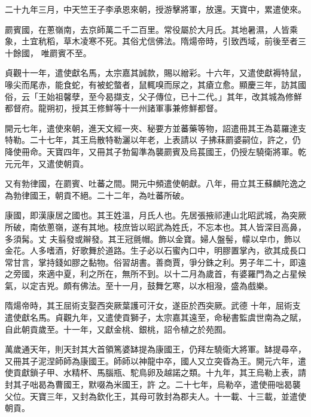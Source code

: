 \begin{pinyinscope}
 二十九年三月，中天竺王子李承恩來朝，授游擊將軍，放還。天寶中，累遣使來。



 罽賓國，在蔥嶺南，去京師萬二千二百里。常役屬於大月氏。其地暑濕，人皆乘象，土宜秔稻，草木凌寒不死。其俗尤信佛法。隋煬帝時，引致西域，前後至者三十餘國，
 唯罽賓不至。



 貞觀十一年，遣使獻名馬，太宗嘉其誠款，賜以繒彩。十六年，又遣使獻褥特鼠，喙尖而尾赤，能食蛇，有被蛇螫者，鼠輒嗅而尿之，其瘡立愈。顯慶三年，訪其國俗，云「王始祖馨孽，至今曷擷支，父子傳位，已十二代。」其年，改其城為修鮮都督府。龍朔初，授其王修鮮等十一州諸軍事兼修鮮都督。



 開元七年，遣使來朝，進天文經一夾、秘要方並蕃藥等物，詔遣冊其王為葛羅達支特勒。二十七年，其王烏散特勒灑以年老，上表請以
 子拂菻罽婆嗣位，許之，仍降使冊命。天寶四年，又冊其子勃匐準為襲罽賓及烏萇國王，仍授左驍衛將軍。乾元元年，又遣使朝貢。



 又有勃律國，在罽賓、吐蕃之間。開元中頻遣使朝獻。八年，冊立其王蘇麟陀逸之為勃律國王，朝貢不絕。二十二年，為吐蕃所破。



 康國，即漢康居之國也。其王姓溫，月氏人也。先居張掖祁連山北昭武城，為突厥所破，南依蔥嶺，遂有其地。枝庶皆以昭武為姓氏，不忘本也。其人皆深目高鼻，多須髯。丈
 夫翦發或辮發。其王冠氈帽。飾以金寶。婦人盤髻，幪以皁巾，飾以金花。人多嗜酒，好歌舞於道路。生子必以石蜜內口中，明膠置掌內，欲其成長口常甘言，掌持錢如膠之黏物。俗習胡書。善商賈，爭分銖之利。男子年二十，即遠之旁國，來適中夏，利之所在，無所不到。以十二月為歲首，有婆羅門為之占星候氣，以定吉兇。頗有佛法。至十一月，鼓舞乞寒，以水相潑，盛為戲樂。



 隋煬帝時，其王屈術支娶西突厥葉護可汗女，遂臣於西突厥。武德
 十年，屈術支遣使獻名馬。貞觀九年，又遣使貢獅子，太宗嘉其遠至，命秘書監虞世南為之賦，自此朝貢歲至。十一年，又獻金桃、銀桃，詔令植之於苑囿。



 萬歲通天年，則天封其大首領篤婆缽提為康國王，仍拜左驍衛大將軍。缽提尋卒，又冊其子泥涅師師為康國王。師師以神龍中卒，國人又立突昏為王。開元六年，遣使貢獻鎖子甲、水精杯、馬腦瓶、駝鳥卵及越諾之類。十九年，其王烏勒上表，請封其子咄曷為曹國王，默啜為米國王，許
 之。二十七年，烏勒卒，遣使冊咄曷襲父位。天寶三年，又封為欽化王，其母可敦封為郡夫人。十一載、十三載，並遣使朝貢。




\end{pinyinscope}
